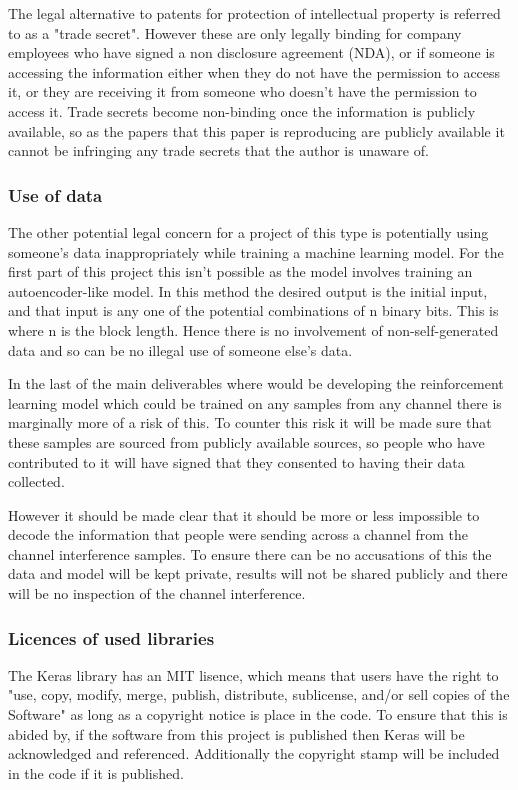 \documentclass[12pt,onecolumn,letterpaper]{article}
\begin{document}
The legal alternative to patents for protection of intellectual property is referred to as a "trade secret". However these are only legally binding for company employees who have signed a non disclosure agreement (NDA), or if someone is accessing the information either when they do not have the permission to access it, or they are receiving it from someone who doesn't have the permission to access it. Trade secrets become non-binding once the information is publicly available, so as the papers that this paper is reproducing are publicly available it cannot be infringing any trade secrets that the author is unaware of. 

\subsubsection{Use of data}

The other potential legal concern for a project of this type is potentially using someone's data inappropriately while training a machine learning model. For the first part of this project this isn't possible as the model involves training an autoencoder-like model. In this method the desired output is the initial input, and that input is any one of the potential combinations of n binary bits. This is where n is the block length. Hence there is no involvement of non-self-generated data and so can be no illegal use of someone else's data.

In the last of the main deliverables where would be developing the reinforcement learning model which could be trained on any samples from any channel there is marginally more of a risk of this. To counter this risk it will be made sure that these samples are sourced from publicly available sources, so people who have contributed to it will have signed that they consented to having their data collected. 

However it should be made clear that it should be more or less impossible to decode the information that people were sending across a channel from the channel interference samples. To ensure there can be no accusations of this the data and model will be kept private, results will not be shared publicly and there will be no inspection of the channel interference.

\subsubsection{Licences of used libraries}

The Keras library has an MIT lisence, which means that users have the right to "use, copy, modify, merge, publish, distribute, sublicense, and/or sell copies of the Software" as long as a copyright notice is place in the code. To ensure that this is abided by, if the software from this project is published then Keras will be acknowledged and referenced. Additionally the copyright stamp will be included in the code if it is published. 
\end{document}
